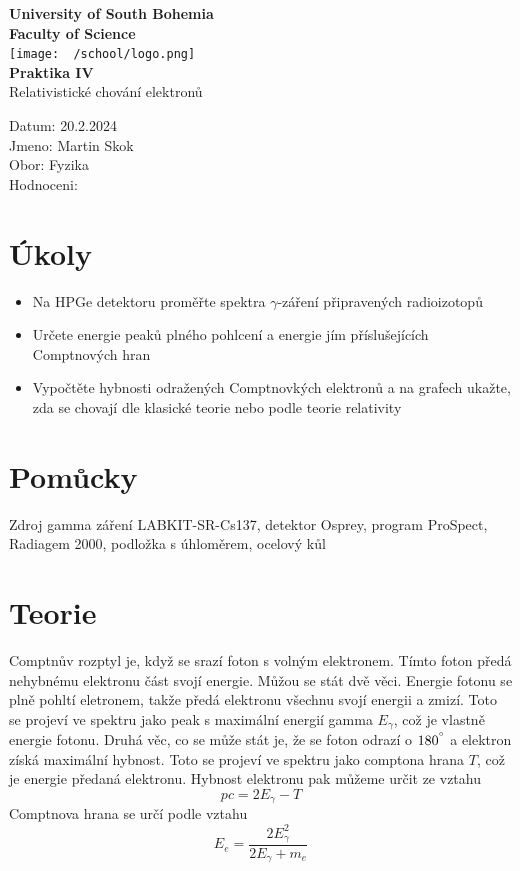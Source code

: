 \documentclass{article}
\begin{document}
\begin{center}
\textbf{\Huge{University of South Bohemia}}\\
\vspace{50px}
\textbf{\Large{Faculty of Science}} \\
\vspace{30px}
\texttt{[image: ~/school/logo.png]} \\
\vspace{30px}
\textbf{\large{Praktika IV}}
\vspace{20px}
\\
\vspace{20px}
\large{Relativistické chování elektronů} \\
\vspace{60px}
\end{center}
\begin{flushleft}
Datum: 20.2.2024 \\
Jmeno: Martin Skok \\
Obor: Fyzika \\
Hodnoceni:
\end{flushleft}
\newpage
\section{Úkoly}
\begin{itemize}
  \item Na HPGe detektoru proměřte spektra $\gamma$-záření připravených radioizotopů
  \item Určete energie peaků plného pohlcení a energie jím příslušejících Comptnových hran
  \item Vypočtěte hybnosti odražených Comptnovkých elektronů a na grafech ukažte,
        zda se chovají dle klasické teorie nebo podle teorie relativity
\end{itemize}
\section{Pomůcky}
Zdroj gamma záření LABKIT-SR-Cs137, detektor Osprey, program ProSpect, Radiagem
2000, podložka s úhloměrem, ocelový kůl
\section{Teorie}
Comptnův rozptyl je, když se srazí foton s volným elektronem. Tímto foton předá nehybnému elektronu část svojí energie. Můžou se stát dvě věci. Energie fotonu se plně pohltí eletronem, takže předá elektronu všechnu svojí energii a zmizí. Toto se projeví ve spektru jako peak s maximální energií gamma $E_{\gamma}$, což je vlastně energie fotonu.
Druhá věc, co se může stát je, že se foton odrazí o $180^{\degree}$ a elektron získá maximální hybnost. Toto se projeví ve spektru jako comptona hrana $T$, což je energie předaná elektronu.
Hybnost elektronu pak můžeme určit ze vztahu
\begin{equation}\label{eq:hyb}
  pc = 2E_{\gamma} - T
\end{equation}
Comptnova hrana se určí podle vztahu
\begin{equation}\label{eq:com}
  E_{e} = \frac{2E_{\gamma}^{2}}{2E_{\gamma} + m_{e}}
\end{equation}
\end{document}
